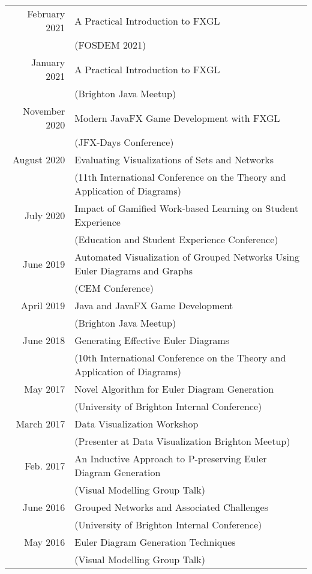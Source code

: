 \documentclass[a4paper,11pt]{article} %
\begin{document}
\begin{center}
\begin{tabular}{rl}

February 2021 & A Practical Introduction to FXGL\\ & (FOSDEM 2021) \\

January 2021 & A Practical Introduction to FXGL\\ & (Brighton Java Meetup) \\

November 2020 & Modern JavaFX Game Development with FXGL\\ & (JFX-Days Conference) \\

August 2020 & Evaluating Visualizations of Sets and Networks\\ & (11th International Conference on the Theory and Application of Diagrams) \\

July 2020 & Impact of Gamified Work-based Learning on Student Experience\\ & (Education and Student Experience Conference)\\

June 2019 & Automated Visualization of Grouped Networks Using Euler Diagrams and Graphs\\ & (CEM Conference) \\

April 2019 & Java and JavaFX Game Development\\ & (Brighton Java Meetup) \\

June 2018 & Generating Effective Euler Diagrams\\ & (10th International Conference on the Theory and Application of Diagrams) \\

May 2017 & Novel Algorithm for Euler Diagram Generation\\ & (University of Brighton Internal Conference) \\

March 2017 & Data Visualization Workshop\\ & (Presenter at Data Visualization Brighton Meetup) \\

Feb. 2017 & An Inductive Approach to P-preserving Euler Diagram Generation\\ & (Visual Modelling Group Talk) \\

June 2016 & Grouped Networks and Associated Challenges\\ & (University of Brighton Internal Conference) \\

May 2016 & Euler Diagram Generation Techniques\\ & (Visual Modelling Group Talk) \\

\end{tabular}
\end{center}
\end{document}
